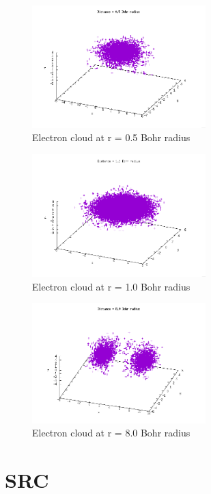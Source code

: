 \documentclass{article}
\begin{document}
\begin{figure}[H]
  \centering
  \includegraphics[width=0.6\textwidth]{05.png}
  \caption{Electron cloud at r = 0.5 Bohr radius}
  \label{fig:0.5}
\end{figure}

\begin{figure}[H]
  \centering
  \includegraphics[width=0.6\textwidth]{10.png}
  \caption{Electron cloud at r = 1.0 Bohr radius}
  \label{fig:1.0}
\end{figure}

\begin{figure}[H]
  \centering
  \includegraphics[width=0.6\textwidth]{80.png}
  \caption{Electron cloud at r = 8.0 Bohr radius}
  \label{fig:8.0}
\end{figure}

\section{SRC}
\label{sec-4}
\end{document}
